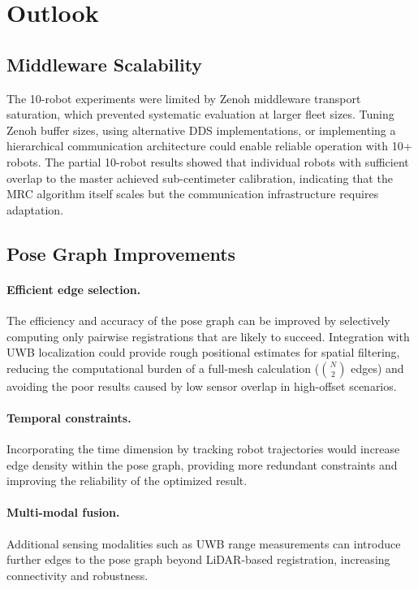 \section{Outlook}

\subsection{Middleware Scalability}

The 10-robot experiments were limited by Zenoh middleware transport
saturation, which prevented systematic evaluation at larger fleet sizes.
Tuning Zenoh buffer sizes, using alternative DDS implementations, or
implementing a hierarchical communication architecture could enable
reliable operation with 10+ robots.
The partial 10-robot results showed that individual robots with
sufficient overlap to the master achieved sub-centimeter calibration,
indicating that the MRC algorithm itself scales but the communication
infrastructure requires adaptation.

\subsection{Pose Graph Improvements}

\paragraph{Efficient edge selection.}
The efficiency and accuracy of the pose graph can be improved by
selectively computing only pairwise registrations that are likely to
succeed.
Integration with UWB localization could provide rough positional
estimates for spatial filtering, reducing the computational burden of
a full-mesh calculation ($\binom{N}{2}$ edges) and avoiding the poor
results caused by low sensor overlap in high-offset scenarios.

\paragraph{Temporal constraints.}
Incorporating the time dimension by tracking robot trajectories would
increase edge density within the pose graph, providing more redundant
constraints and improving the reliability of the optimized result.

\paragraph{Multi-modal fusion.}
Additional sensing modalities such as UWB range measurements can
introduce further edges to the pose graph beyond LiDAR-based
registration, increasing connectivity and robustness.

